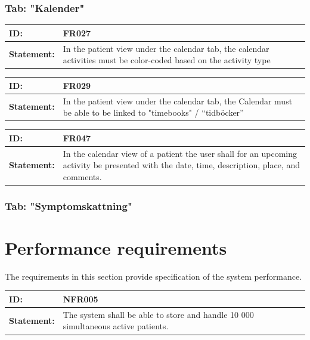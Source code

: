 \documentclass{scrreprt}
\begin{document}
\subsubsection{Tab: "Kalender"}
\begin{center}

\begin{tabularx}{\linewidth}{| l | X |}
 \hline
 \textbf{ID:} & FR027  \\ 
 \hline
 \textbf{Statement:} & In the patient view under the calendar tab, the calendar activities must be color-coded based on the activity type
 \\ 
 \hline
\end{tabularx}

\begin{tabularx}{\linewidth}{| l | X |}
 \hline
 \textbf{ID:} & FR029  \\ 
 \hline
 \textbf{Statement:} & In the patient view under the calendar tab, the Calendar must be able to be linked to "timebooks" / “tidböcker”
 \\ 
 \hline
\end{tabularx}

\begin{tabularx}{\linewidth}{| l | X |}
 \hline
 \textbf{ID:} & FR047  \\ 
 \hline
 \textbf{Statement:} & In the calendar view of a patient the user shall for an upcoming activity be presented with the date, time, description, place, and comments.
 \\ 
 \hline
\end{tabularx}

\end{center}


\subsubsection{Tab: "Symptomskattning"}




\section{Performance requirements}
The requirements in this section provide specification of the system performance. 

\begin{center}
\begin{tabularx}{\linewidth}{| l | X |}
 \hline
 \textbf{ID:} & NFR005  \\ 
 \hline
 \textbf{Statement:} & The system shall be able to store and handle 10 000 simultaneous active patients.
 \\ 
 \hline
\end{tabularx}
\end{center}
\end{document}

